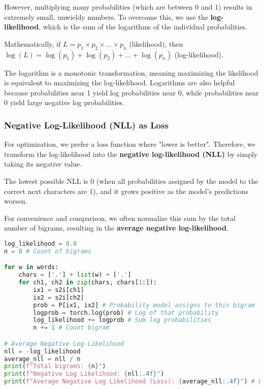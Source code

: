 However, multiplying many probabilities (which are between 0 and 1) results in extremely small, unwieldy numbers. To overcome this, we use the \textbf{log-likelihood}, which is the sum of the logarithms of the individual probabilities.

Mathematically, if $L = p_1 \times p_2 \times \dots \times p_n$ (likelihood), then $\log(L) = \log(p_1) + \log(p_2) + \dots + \log(p_n)$ (log-likelihood).

The logarithm is a monotonic transformation, meaning maximizing the likelihood is equivalent to maximizing the log-likelihood. Logarithms are also helpful because probabilities near 1 yield log probabilities near 0, while probabilities near 0 yield large negative log probabilities.

\subsubsection{Negative Log-Likelihood (NLL) as Loss}
For optimization, we prefer a loss function where "lower is better". Therefore, we transform the log-likelihood into the \textbf{negative log-likelihood (NLL)} by simply taking its negative value.

The lowest possible NLL is 0 (when all probabilities assigned by the model to the correct next characters are 1), and it grows positive as the model's predictions worsen.

For convenience and comparison, we often normalize this sum by the total number of bigrams, resulting in the \textbf{average negative log-likelihood}.

\begin{lstlisting}[language=Python, caption=Calculating Average Negative Log-Likelihood Loss]
log_likelihood = 0.0
n = 0 # Count of bigrams

for w in words:
    chars = ['.'] + list(w) + ['.']
    for ch1, ch2 in zip(chars, chars[1:]):
        ix1 = s2i[ch1]
        ix2 = s2i[ch2]
        prob = P[ix1, ix2] # Probability model assigns to this bigram
        logprob = torch.log(prob) # Log of that probability
        log_likelihood += logprob # Sum log probabilities
        n += 1 # Count bigram

# Average Negative Log-Likelihood
nll = -log_likelihood
average_nll = nll / n
print(f"Total bigrams: {n}")
print(f"Negative Log Likelihood: {nll:.4f}")
print(f"Average Negative Log Likelihood (Loss): {average_nll:.4f}") # Expected: ~2.45 after smoothing
\end{lstlisting}

